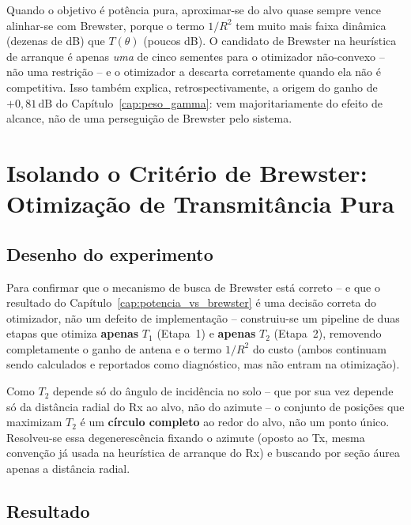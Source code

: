 \documentclass[12pt,a4paper,oneside]{book}
\newcommand{\result}[2]{%
  \begin{tcolorbox}[enhanced, breakable,
    colback=yellow!8, colframe=orange!70!black,
    fonttitle=\bfseries,
    title={\protect#1},
    attach boxed title to top left={yshift=-2mm, xshift=5mm},
    boxed title style={colback=orange!70!black}]
    #2
  \end{tcolorbox}}
\theoremstyle{definition}
\theoremstyle{remark}
\begin{document}
\result{Conclusão do Capítulo}{
Quando o objetivo é potência pura, aproximar-se do alvo quase sempre vence
alinhar-se com Brewster, porque o termo $1/R^2$ tem muito mais faixa
dinâmica (dezenas de dB) que $T(\theta)$ (poucos dB). O candidato de
Brewster na heurística de arranque é apenas \emph{uma} de cinco sementes
para o otimizador não-convexo -- não uma restrição -- e o otimizador a
descarta corretamente quando ela não é competitiva. Isso também explica,
retrospectivamente, a origem do ganho de $+0{,}81\,\mathrm{dB}$ do
Capítulo~\ref{cap:peso_gamma}: vem majoritariamente do efeito de alcance,
não de uma perseguição de Brewster pelo sistema.
}

\chapter{Isolando o Critério de Brewster: Otimização de Transmitância Pura}
\label{cap:brewster_puro}

\section{Desenho do experimento}

Para confirmar que o mecanismo de busca de Brewster está correto -- e que
o resultado do Capítulo~\ref{cap:potencia_vs_brewster} é uma decisão
correta do otimizador, não um defeito de implementação -- construiu-se um
pipeline de duas etapas que otimiza \textbf{apenas} $T_1$ (Etapa~1) e
\textbf{apenas} $T_2$ (Etapa~2), removendo completamente o ganho de antena
e o termo $1/R^2$ do custo (ambos continuam sendo calculados e reportados
como diagnóstico, mas não entram na otimização).

Como $T_2$ depende só do ângulo de incidência no solo -- que por sua vez
depende só da distância radial do Rx ao alvo, não do azimute -- o conjunto
de posições que maximizam $T_2$ é um \textbf{círculo completo} ao redor do
alvo, não um ponto único. Resolveu-se essa degenerescência fixando o
azimute (oposto ao Tx, mesma convenção já usada na heurística de arranque
do Rx) e buscando por seção áurea apenas a distância radial.

\section{Resultado}
\end{document}
